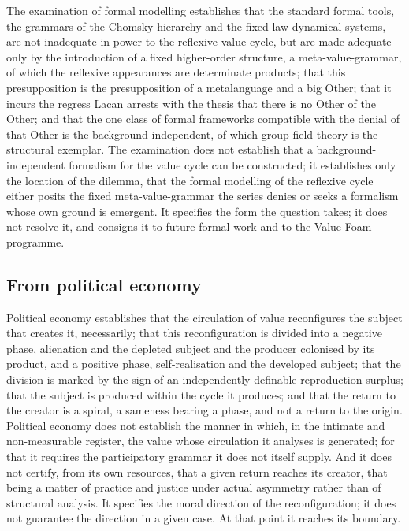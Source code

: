 The examination of formal modelling establishes that the standard formal tools, the grammars of the Chomsky hierarchy and the fixed-law dynamical systems, are not inadequate in power to the reflexive value cycle, but are made adequate only by the introduction of a fixed higher-order structure, a meta-value-grammar, of which the reflexive appearances are determinate products; that this presupposition is the presupposition of a metalanguage and a big Other; that it incurs the regress Lacan arrests with the thesis that there is no Other of the Other; and that the one class of formal frameworks compatible with the denial of that Other is the background-independent, of which group field theory is the structural exemplar. The examination does not establish that a background-independent formalism for the value cycle can be constructed; it establishes only the location of the dilemma, that the formal modelling of the reflexive cycle either posits the fixed meta-value-grammar the series denies or seeks a formalism whose own ground is emergent. It specifies the form the question takes; it does not resolve it, and consigns it to future formal work and to the Value-Foam programme.

\subsection{From political economy}
\label{p10:sec:concl-political}

Political economy establishes that the circulation of value reconfigures the subject that creates it, necessarily; that this reconfiguration is divided into a negative phase, alienation and the depleted subject and the producer colonised by its product, and a positive phase, self-realisation and the developed subject; that the division is marked by the sign of an independently definable reproduction surplus; that the subject is produced within the cycle it produces; and that the return to the creator is a spiral, a sameness bearing a phase, and not a return to the origin. Political economy does not establish the manner in which, in the intimate and non-measurable register, the value whose circulation it analyses is generated; for that it requires the participatory grammar it does not itself supply. And it does not certify, from its own resources, that a given return reaches its creator, that being a matter of practice and justice under actual asymmetry rather than of structural analysis. It specifies the moral direction of the reconfiguration; it does not guarantee the direction in a given case. At that point it reaches its boundary.

